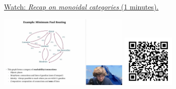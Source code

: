
\begin{minipage}{10cm}
    \href{https://act4e-spring21.netlify.app/videos/spring2021-enrichment:recap-monoidal.html}{Watch: \emph{Recap on monoidal categories} (1 minutes).}
        
    \href{https://act4e-spring21.netlify.app/videos/spring2021-enrichment:recap-monoidal.html}{\includegraphics[height=3.5cm]{spring2021-enrichment:recap-monoidal/thumbnails.jpg}}
    \href{https://act4e-spring21.netlify.app/videos/spring2021-enrichment:recap-monoidal.html}{\includegraphics[height=2.5cm]{spring2021-enrichment:recap-monoidal/qrcode.png}}
\end{minipage}

